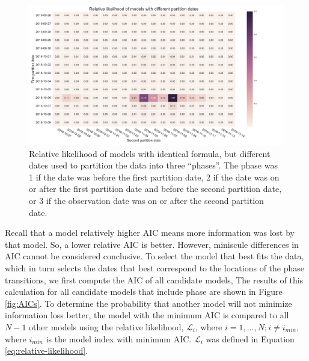 \begin{figure}
  \centering
  \hspace*{-.25in}
  \includegraphics[width=1.25\textwidth]{figures/rel_likelihood_dates-FIG2.pdf}

\caption{
  Relative likelihood of models with identical formula, but different dates
  used to partition the data into three ``phases''. The phase 
  was 1 if the date was before
  the first partition date, 2 if the date was on or after
  the first partition date and before the second partition date, or
  3 if the observation date was on or after the second partition date.
}
\label{fig:relative-likelihoods}
\end{figure}

Recall that a model relatively higher AIC means more information was lost by
that model. So, a lower relative AIC is better. However, miniscule differences
in AIC cannot be considered conclusive. To select the model that best fits the
data, which in turn selects the dates that best correspond to the locations
of the phase transitions, we first compute the AIC of all candidate models, 
The results of this calculation for all candidate models that include phase
are shown in Figure \ref{fig:AICs}. To determine the probability that 
another model will not minimize information loss better,
the model with the minimum AIC is compared to all $N-1$ other models using
the relative likelihood, $\mathcal{L}_i$, where $i = 1, \ldots, N; i \neq i_{min}$,
where $i_{min}$ is the model index with minimum AIC. $\mathcal{L}_i$ was defined
in Equation \ref{eq:relative-likelihood}. 


